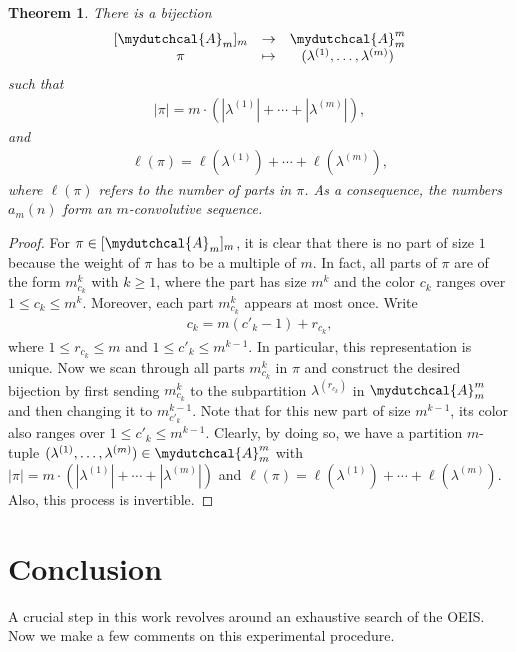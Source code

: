 \documentclass[12pt,reqno]{amsart}
\numberwithin{equation}{section}
\theoremstyle{plain}
\newtheorem{theorem}{Theorem}[section]
\theoremstyle{definition}
\theoremstyle{named}
\newcommand{\cA}{\mydutchcal{A}}
\begin{document}
\begin{theorem}
	There is a bijection
	\begin{align*}
		\begin{array}{ccc}
			[\cA_m]_m & \to & \cA_m^m\\
			\pi & \mapsto & (\lambda^{(1)},\ldots,\lambda^{(m)})
		\end{array}
	\end{align*}
	such that
	\begin{align*}
		|\pi| = m\cdot (|\lambda^{(1)}|+\cdots+|\lambda^{(m)}|),
	\end{align*}
	and
	\begin{align*}
		\ell(\pi) = \ell(\lambda^{(1)})+\cdots+\ell(\lambda^{(m)}),
	\end{align*}
	where $\ell(\pi)$ refers to the number of parts in $\pi$. As a consequence, the numbers $a_m(n)$ form an $m$-convolutive sequence.
\end{theorem}

\begin{proof}
	For $\pi \in [\cA_m]_m$, it is clear that there is no part of size $1$ because the weight of $\pi$ has to be a multiple of $m$. In fact, all parts of $\pi$ are of the form $m_{c_k}^k$ with $k\ge 1$, where the part has size $m^k$ and the color $c_k$ ranges over $1\le c_k\le m^k$. Moreover, each part $m_{c_k}^k$ appears at most once. Write
	\begin{align*}
		c_k = m (c'_k - 1) + r_{c_k},
	\end{align*}
	where $1\le r_{c_k}\le m$ and $1\le c'_k\le m^{k-1}$. In particular, this representation is unique. Now we scan through all parts $m_{c_k}^k$ in $\pi$ and construct the desired bijection by first sending $m_{c_k}^k$ to the subpartition $\lambda^{(r_{c_k})}$ in $\cA_m^m$ and then changing it to $m_{c'_k}^{k-1}$. Note that for this new part of size $m^{k-1}$, its color also ranges over $1\le c'_k\le m^{k-1}$. Clearly, by doing so, we have a partition $m$-tuple $(\lambda^{(1)},\ldots,\lambda^{(m)})\in \cA_m^m$ with $|\pi| = m\cdot (|\lambda^{(1)}|+\cdots+|\lambda^{(m)}|)$ and $\ell(\pi) = \ell(\lambda^{(1)})+\cdots+\ell(\lambda^{(m)})$. Also, this process is invertible.
\end{proof}

\section{Conclusion}\label{sec:conclusion}

A crucial step in this work revolves around an exhaustive search of the OEIS. Now we make a few comments on this experimental procedure.
\end{document}
